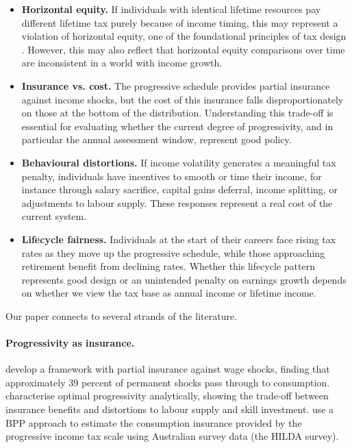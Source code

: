 \documentclass[12pt,a4paper]{article}
\begin{document}
\begin{itemize}
\item \textbf{Horizontal equity.} If individuals with identical lifetime resources pay different lifetime tax purely because of income timing, this may represent a violation of horizontal equity, one of the foundational principles of tax design \citep{Musgrave1990}. However, this may also reflect that horizontal equity comparisons over time are inconsistent in a world with income growth.

\item \textbf{Insurance vs. cost.} The progressive schedule provides partial insurance against income shocks, but the cost of this insurance falls disproportionately on those at the bottom of the distribution. Understanding this trade-off is essential for evaluating whether the current degree of progressivity, and in particular the annual assessment window, represent good policy.

\item \textbf{Behavioural distortions.} If income volatility generates a meaningful tax penalty, individuals have incentives to smooth or time their income, for instance through salary sacrifice, capital gains deferral, income splitting, or adjustments to labour supply. These responses represent a real cost of the current system.

\item \textbf{Lifecycle fairness.} Individuals at the start of their careers face rising tax rates as they move up the progressive schedule, while those approaching retirement benefit from declining rates. Whether this lifecycle pattern represents good design or an unintended penalty on earnings growth depends on whether we view the tax base as annual income or lifetime income.
\end{itemize}

Our paper connects to several strands of the literature.

\paragraph{Progressivity as insurance.} \citet{HeathcoteStorViol2014} develop a framework with partial insurance against wage shocks, finding that approximately 39 percent of permanent shocks pass through to consumption. \citet{HeathcoteStorViol2017} characterise optimal progressivity analytically, showing the trade-off between insurance benefits and distortions to labour supply and skill investment. \citet{Choetal2024} use a BPP approach to estimate the consumption insurance provided by the progressive income tax scale using Australian survey data (the HILDA survey).
\end{document}
